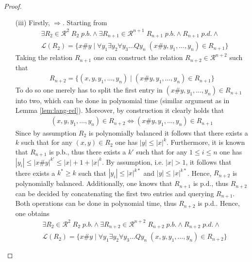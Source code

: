 \documentclass [11pt]{article}
\begin{document}
\begin{proof}
\begin{enumerate}
\item[(iii)] Firstly, $\Rightarrow$. Starting from 
 \begin{equation*}
\begin{split}
&\exists R_2 \in \mathcal{R}^{2} \; R_2 \; p.b.  \land  \exists R_{n+1}  \in  \mathcal{R}^{n+1} \; R_{n+1} \; p.b. \land R_{n+1} \; p.d. \land  \\
&\mathcal{L}(R_2) = \{x\#y \mid \forall y_1 \exists y_2\forall y_3\dots Q y_n  \; (x\#y,y_1,\ldots,y_n) \in R_{n+1}\} 
\end{split}
\end{equation*}
Taking the relation $R_{n+1}$ one can construct the relation $R_{n+2} \in \mathcal{R}^{n+2}$ such that 
 \begin{equation*}
\begin{split}
 R_{n+2}=\{ (x,y,y_1,\ldots,y_n) \mid (x\#y,y_1,\ldots,y_n) \in R_{n+1}\} 
\end{split}
\end{equation*}
To do so one merely has to split the first entry in $(x\#y,y_1,\ldots,y_n) \in R_{n+1}$ into two, which can be done in polynomial time (similar argument as in Lemma \ref{lem:lang-rel}). Moreover, by construction it clearly holds that
 \begin{equation*}
\begin{split}
 (x,y,y_1,\ldots,y_n) \in R_{n+2} \iff  (x\#y,y_1,\ldots,y_n) \in R_{n+1}
\end{split}
\end{equation*}
Since by assumption $R_2$ is polynomially balanced it follows that there exists a $k$ such that for any $(x,y) \in R_{2}$ one has $|y| \leq |x|^k$. Furthermore, it is known that $R_{n+1}$ is p.b., thus there exists a $k'$ such that for any $1 \leq i \leq n$ one has $|y_i| \leq |x\#y|^{k'}\leq |x| +1 +|x|^k$. By assumption, i.e. $|x|>1$, it follows that there exists a $k^* \geq k$ such that $|y_i| \leq |x|^{k*}$ and $|y| \leq |x|^{k*}$. Hence, $R_{n+2}$ is polynomially balanced. 
Additionally, one knows that $R_{n+1}$ is p.d., thus $R_{n+2}$ can be decided by concatenating the first two entries and querying $R_{n+1}$. Both operations can be done in polynomial time, thus $R_{n+2}$ is p.d..
Hence, one obtains 
 \begin{equation*}
\begin{split}
&\exists R_2 \in \mathcal{R}^{2} \; R_2 \; p.b.  \land  \exists R_{n+2}  \in  \mathcal{R}^{n+2} \; R_{n+2} \; p.b. \land R_{n+2} \; p.d. \land  \\
&\mathcal{L}(R_2) = \{x\#y \mid \forall y_1 \exists y_2\forall y_3\dots Q y_n  \; (x,y,y_1,\ldots,y_n) \in R_{n+2}\} 
\end{split}
\end{equation*}


\end{enumerate}
\end{proof}
\end{document}
